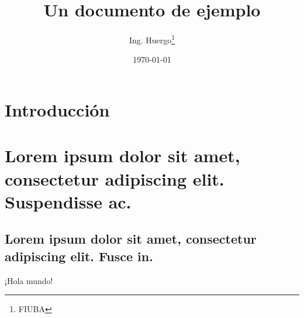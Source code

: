 \documentclass{article}
\begin{document}
\title{Un documento de ejemplo} %
\date{\today} %
\author{Ing. Huergo\thanks{FIUBA}} %

\maketitle %

\newpage %

\tableofcontents %

\newpage %

\section*{Introducción}

\section{Lorem ipsum dolor sit amet, consectetur adipiscing elit. Suspendisse ac.}

\subsection[Fusce in]{Lorem ipsum dolor sit amet, consectetur adipiscing elit. Fusce in.}

¡Hola mundo!
\end{document}
